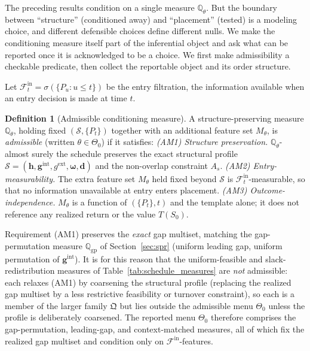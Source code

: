 \documentclass[preprint,12pt]{elsarticle}
\theoremstyle{definition}
\newtheorem{definition}{Definition}
\begin{document}
The preceding results condition on a single measure $\mathbb{Q}_\theta$. But the
boundary between ``structure'' (conditioned away) and ``placement'' (tested) is a
modeling choice, and different defensible choices define different nulls. We make
the conditioning measure itself part of the inferential object and ask what can be
reported once it is acknowledged to be a choice. We first make admissibility a
checkable predicate, then collect the reportable object and its order structure.

Let $\mathcal F_t^{\mathrm{in}}=\sigma(\{P_u:u\le t\})$ be the entry filtration,
the information available when an entry decision is made at time $t$.

\begin{definition}[Admissible conditioning measure]
\label{def:admissible}
A structure-preserving measure $\mathbb{Q}_\theta$, holding fixed
$(\mathcal S,\{P_t\})$ together with an additional feature set $M_\theta$, is
\emph{admissible} (written $\theta\in\Theta_0$) if it satisfies:
\emph{(AM1) Structure preservation.} $\mathbb{Q}_\theta$-almost surely the schedule
preserves the exact structural profile
$\mathcal S=(\mathbf h,\mathbf g^{\mathrm{int}},g^{\mathrm{ext}},\boldsymbol\omega,
\mathbf d)$ and the non-overlap constraint $A_s$.
\emph{(AM2) Entry-measurability.} The extra feature set $M_\theta$ held fixed beyond
$\mathcal S$ is $\mathcal F_t^{\mathrm{in}}$-measurable, so that no information
unavailable at entry enters placement.
\emph{(AM3) Outcome-independence.} $M_\theta$ is a function of $(\{P_t\},t)$ and the
template alone; it does not reference any realized return or the value $T(S_0)$.
\end{definition}

Requirement (AM1) preserves the \emph{exact} gap multiset, matching the
gap-permutation measure $\mathbb{Q}_{\mathrm{gp}}$ of Section~\ref{sec:spr}
(uniform leading gap, uniform permutation of $\mathbf g^{\mathrm{int}}$). It is for
this reason that the uniform-feasible and slack-redistribution measures of
Table~\ref{tab:schedule_measures} are \emph{not} admissible: each relaxes (AM1) by
coarsening the structural profile (replacing the realized gap multiset by a less
restrictive feasibility or turnover constraint), so each is a member of the larger
family $\mathfrak Q$ but lies outside the admissible menu $\Theta_0$ unless the
profile is deliberately coarsened. The reported menu $\Theta_0$ therefore comprises
the gap-permutation, leading-gap, and context-matched measures, all of which fix
the realized gap multiset and condition only on $\mathcal F^{\mathrm{in}}$-features.
\end{document}
